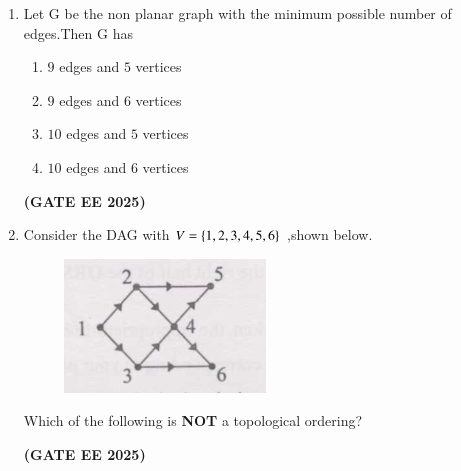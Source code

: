 \documentclass[journal,12pt,onecolumn]{IEEEtran}
\theoremstyle{remark}
\begin{document}
\begin {center}
\begin{enumerate}
    \begin{enumerate}[label=(\Alph*)]
\end{enumerate}
\hfill \textbf{(GATE EE 2025)}


\item   Let G be the non planar graph with the minimum possible number of edges.Then G has

\begin{enumerate}

    \item $9$ edges and  $5$  vertices
    \item $9$ edges and  $6$  vertices
    \item $10$ edges and  $5$  vertices
    \item $10$ edges and  $6$  vertices

\end{enumerate}
\hfill \textbf{(GATE EE 2025)}

\item    Consider the DAG with $V=\left\{1,2,3,4,5,6\right\}$ ,shown below.
\newline


    

\begin{figure}[h]
    \centering
    \includegraphics[width=0.2\columnwidth]{figs/fig1.png}
    
    \label{fig1}
    \caption{ }

\end{figure}
   Which of the following is \textbf{NOT} a topological ordering?
   
\begin{enumerate}
\end{enumerate}
\hfill \textbf{(GATE EE 2025)}



\end{enumerate}
\end{center}
\end{document}
